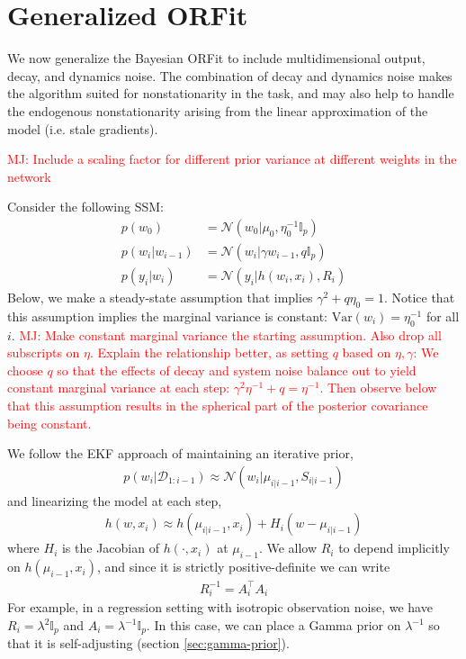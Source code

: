 
\section{Generalized ORFit}

We now generalize the Bayesian ORFit to include multidimensional output,
decay, and dynamics noise. The combination of decay and dynamics noise
makes the algorithm suited for nonstationarity in the task, and may also help to handle the endogenous nonstationarity arising from the linear approximation of the model (i.e. stale gradients).

\textcolor{red}{MJ: Include a scaling factor for different prior variance at different weights in the network}

Consider the following SSM:
\begin{align}
p\left(w_{0}\right) & =\mathcal{N}\left(w_{0}\vert\mu_{0},\eta_{0}^{-1}\mathbb{I}_{p}\right)\\
p\left(w_{i}\vert w_{i-1}\right) & =\mathcal{N}\left(w_{i}\vert\gamma w_{i-1},q\mathbb{I}_{p}\right)\\
p\left(y_{i}\vert w_{i}\right) & =\mathcal{N}\left(y_{i}\vert h\left(w_{i},x_{i}\right),R_{i}\right)
\end{align}
Below, we make a steady-state assumption that implies $\gamma^{2}+q\eta_{0}=1$. Notice that this assumption implies the marginal variance is constant: $\text{Var}(w_i)=\eta_0^{-1}$ for all $i$.
\textcolor{red}{MJ: Make constant marginal variance the starting assumption. Also drop all subscripts on $\eta$. Explain the relationship better, as setting $q$ based on $\eta,\gamma$: We choose $q$ so that the effects of decay and system noise balance out to yield constant marginal variance at each step: $\gamma^2\eta^{-1}+q = \eta^{-1}$. Then observe below that this assumption results in the spherical part of the posterior covariance being constant.}

We follow the EKF approach of maintaining an iterative prior,
\begin{align}
p\left(w_{i}\vert\mathcal{D}_{1:i-1}\right)\approx\mathcal{N}\left(w_{i}\vert\mu_{i\vert i-1},S_{i\vert i-1}\right)
\end{align}
and linearizing the model at each step,
\begin{align}
h\left(w,x_{i}\right)\approx h\left(\mu_{i\vert i-1},x_{i}\right)+H_{i}\left(w-\mu_{i\vert i-1}\right)
\end{align}
where $H_i$ is the Jacobian of $h\left(\cdot,x_{i}\right)$ at $\mu_{i-1}$.
We allow $R_{i}$ to depend implicitly on $h\left(\mu_{i-1},x_{i}\right)$,
and since it is strictly positive-definite we can write
\begin{align}
R_{i}^{-1}=A_{i}^{\top}A_{i}
\end{align}
For example, in a regression setting with isotropic observation noise,
we have $R_{i}=\lambda^{2}\mathbb{I}_{p}$ and $A_{i}=\lambda^{-1}\mathbb{I}_{p}$.
In this case, we can place a Gamma prior on $\lambda^{-1}$ so that it
is self-adjusting (section \ref{sec:gamma-prior}). 

